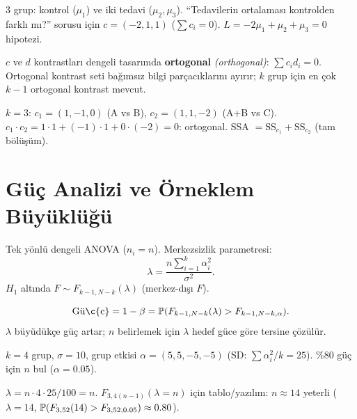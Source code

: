 \begin{ornek}\label{ex:kontrast}
3 grup: kontrol ($\mu_1$) ve iki tedavi ($\mu_2,\mu_3$). ``Tedavilerin ortalaması kontrolden farklı mı?'' sorusu için $c=(-2,1,1)$ ($\sum c_i=0$). $L=-2\mu_1+\mu_2+\mu_3=0$ hipotezi.
\end{ornek}

\begin{tanim}\label{def:ortogonal_kontrast}
$c$ ve $d$ kontrastları dengeli tasarımda \textbf{ortogonal} \emph{(orthogonal)}: $\sum c_i d_i=0$. Ortogonal kontrast seti bağımsız bilgi parçacıklarını ayırır; $k$ grup için en çok $k-1$ ortogonal kontrast mevcut.
\end{tanim}

\begin{ornek}\label{ex:ortogonal_kontrast}
$k=3$: $c_1=(1,-1,0)$ (A vs B), $c_2=(1,1,-2)$ (A+B vs C). $c_1\cdot c_2=1\cdot1+(-1)\cdot1+0\cdot(-2)=0$: ortogonal. SSA $= \mathrm{SS}_{c_1} + \mathrm{SS}_{c_2}$ (tam bölüşüm).
\end{ornek}

\section{Güç Analizi ve Örneklem Büyüklüğü}
\label{sec:anova_guc}

\begin{tanim}\label{def:anova_guc}
Tek yönlü dengeli ANOVA ($n_i=n$). Merkezsizlik parametresi:
\[
  \lambda = \frac{n\sum_{i=1}^k\alpha_i^2}{\sigma^2}.
\]
$H_1$ altında $F\sim F_{k-1,N-k}(\lambda)$ (merkez-dışı $F$).
\end{tanim}

\begin{teorem}\label{thm:anova_guc}
\[
  \mathrm{G\ddot{u}\c{c}} = 1-\beta = \Prob(F_{k-1,N-k}(\lambda) > F_{k-1,N-k,\alpha}).
\]
$\lambda$ büyüdükçe güç artar; $n$ belirlemek için $\lambda$ hedef güce göre tersine çözülür.
\end{teorem}

\begin{ornek}\label{ex:anova_n}
$k=4$ grup, $\sigma=10$, grup etkisi $\alpha=(5,5,-5,-5)$ (SD: $\sum\alpha_i^2/k=25$). \%80 güç için $n$ bul ($\alpha=0.05$).

$\lambda = n\cdot4\cdot25/100 = n$. $F_{3,4(n-1)}(\lambda=n)$ için tablo/yazılım: $n\approx14$ yeterli ($\lambda=14$, $\mathbb{P}(F_{3,52}(14)>F_{3,52,0.05})\approx0.80$).
\end{ornek}

